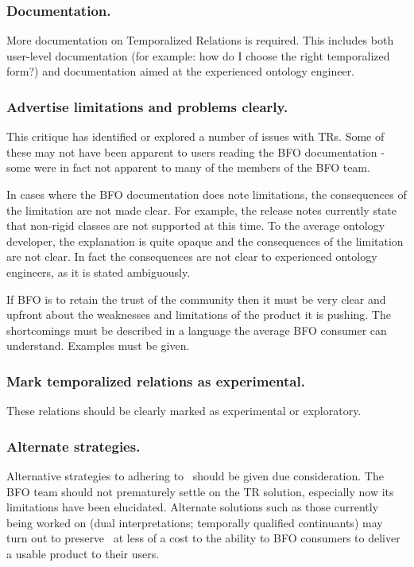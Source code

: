 \documentclass{bioinfo}
\def\P1{\pr{P-1}}
\begin{document}
\subsubsection{Documentation.} More documentation on Temporalized
Relations is required. This includes both user-level documentation
(for example: how do I choose the right temporalized form?) and
documentation aimed at the experienced ontology engineer.

\subsubsection{Advertise limitations and problems clearly.} This
critique has identified or explored a number of issues with TRs. Some
of these may not have been apparent to users reading the BFO
documentation - some were in fact not apparent to many of the members
of the BFO team.

In cases where the BFO documentation does note limitations, the
consequences of the limitation are not made clear. For example, the
release notes currently state that non-rigid classes are not supported
at this time. To the average ontology developer, the explanation is
quite opaque and the consequences of the limitation are not clear. In
fact the consequences are not clear to experienced ontology
engineers, as it is stated ambiguously.

If BFO is to retain the trust of the community then it must be very
clear and upfront about the weaknesses and limitations of the product
it is pushing. The shortcomings must be described in a language the
average BFO consumer can understand. Examples must be given.

\subsubsection{Mark temporalized relations as experimental.} These
relations should be clearly marked as experimental or exploratory. 

\subsubsection{Alternate strategies.} Alternative strategies to
adhering to \P1\ should be given due consideration. The BFO team
should not prematurely settle on the TR solution, especially now its
limitations have been elucidated. Alternate solutions such as those
currently being worked on (dual interpretations; temporally qualified
continuants)\cite{Grewe} may turn out to preserve \P1\ at less of a
cost to the ability to BFO consumers to deliver a usable product to
their users.
\end{document}
